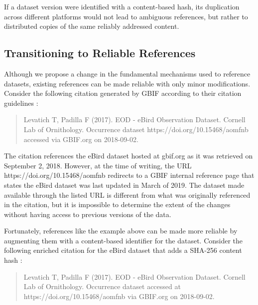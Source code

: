 If a dataset version were identified with a content-based hash, its duplication across different platforms would not lead to ambiguous references, but rather to distributed copies of the same reliably addressed content.

% 

\subsection*{Transitioning to Reliable References}
Although we propose a change in the fundamental mechanisms used to reference datasets, existing references can be made reliable with only minor modifications. Consider the following citation generated by GBIF according to their citation guidelines :

\begin{quote}
Levatich T, Padilla F (2017). EOD - eBird Observation Dataset. Cornell Lab of Ornithology. Occurrence dataset https://doi.org/10.15468/aomfnb accessed via GBIF.org on 2018-09-02.
\end{quote}

The citation references the eBird dataset hosted at gbif.org as it was retrieved on September 2, 2018. However, at the time of writing, the URL https://doi.org/10.15468/aomfnb redirects to a GBIF internal reference page that states the eBird dataset was last updated in March of 2019. The dataset made available through the listed URL is different from what was originally referenced in the citation, but it is impossible to determine the extent of the changes without having access to previous versions of the data.

Fortunately, references like the example above can be made more reliable by augmenting them with a content-based identifier for the dataset. Consider the following enriched citation for the eBird dataset that adds a SHA-256 content hash :

\begin{quote}
Levatich T, Padilla F (2017). EOD - eBird Observation Dataset. Cornell Lab of Ornithology. Occurrence dataset  accessed at https://doi.org/10.15468/aomfnb via GBIF.org on 2018-09-02.
\end{quote}

